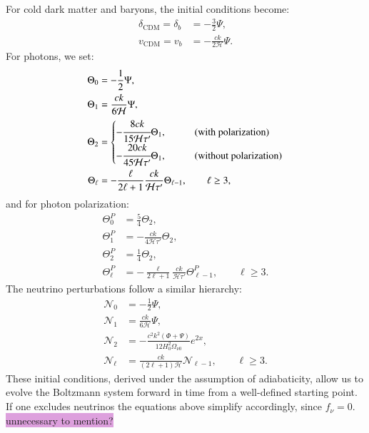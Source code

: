 \documentclass{aa}
\numberwithin{equation}{section}
\numberwithin{table}{section}
\numberwithin{figure}{section}
\begin{document}
For cold dark matter and baryons, the initial conditions become:
\begin{align}
\delta_\text{CDM} = \delta_b &= -\frac{3}{2}\Psi, \\
v_\text{CDM} = v_b &= -\frac{ck}{2\mathcal{H}} \Psi.
\end{align}
For photons, we set:
\begin{align}
\Theta_0 &= -\frac{1}{2} \Psi, \\
\Theta_1 &= \frac{ck}{6\mathcal{H}} \Psi, \\
\Theta_2 &= \begin{cases}-\cfrac{8ck}{15\mathcal{H} \tau'} \Theta_1, \qquad&\text{(with polarization)} \\
  -\cfrac{20ck}{45\mathcal{H} \tau'} \Theta_1, \hspace{3pt}&\text{(without polarization)}
\end{cases} \label{eq: initial quadrupole} \\
\Theta_\ell &= -\frac{\ell}{2\ell+1} \frac{ck}{\mathcal{H} \tau'} \Theta_{\ell-1}, \qquad \ell \geq 3,
\end{align}
and for photon polarization:
\begin{align}
\Theta_0^P &= \frac{5}{4} \Theta_2, \\
\Theta_1^P &= -\frac{ck}{4\mathcal{H} \tau'} \Theta_2, \\
\Theta_2^P &= \frac{1}{4} \Theta_2, \\
\Theta_\ell^P &= -\frac{\ell}{2\ell+1} \frac{ck}{\mathcal{H} \tau'} \Theta_{\ell-1}^P, \qquad \ell \geq 3. \label{eq: initial polarization multipole}
\end{align}
The neutrino perturbations follow a similar hierarchy:
\begin{align}
\mathcal{N}_0 &= -\frac{1}{2} \Psi, \\
\mathcal{N}_1 &= \frac{ck}{6\mathcal{H}} \Psi, \\
\mathcal{N}_2 &= -\frac{c^2 k^2  (\Phi + \Psi)}{12 H_0^2\Omega_{\nu0}}e^{2x}, \\
\mathcal{N}_\ell &= \frac{ck}{(2\ell+1)\mathcal{H}} \mathcal{N}_{\ell-1}, \qquad \ell \geq 3.
\end{align}
These initial conditions, derived under the assumption of adiabaticity, allow us to evolve the Boltzmann system forward in time from a well-defined starting point. If one excludes neutrinos the equations above simplify accordingly, since $f_\nu=0$. \colorbox{Plum}{unnecessary to mention?}
\end{document}
